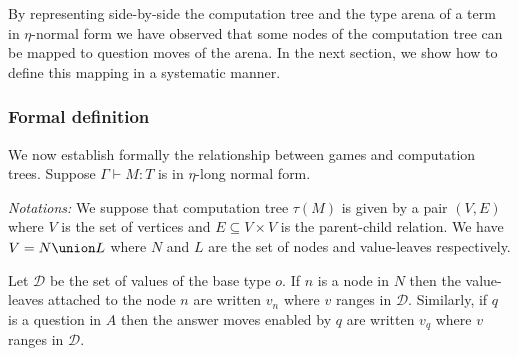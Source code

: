By representing side-by-side the computation tree and the type arena of a term in $\eta$-normal form we have observed
that some nodes of the computation tree can be mapped to question moves of the arena.
In the next section, we show how to define this mapping in a systematic manner.

\subsubsection{Formal definition}

We now establish formally the relationship between games and
computation trees. Suppose $\Gamma \vdash M : T$ is in $\eta$-long
normal form.

\emph{Notations:} We suppose that computation tree $\tau(M)$ is given by
a pair $(V,E)$ where $V$ is the set of vertices and $E \subseteq
V \times V$ is the parent-child relation. We have $V = N \union L$
where $N$ and $L$ are the set of nodes and value-leaves respectively.

Let $\mathcal{D}$ be the set of values of the base type $o$. If $n$
is a node in $N$ then the value-leaves attached to the node $n$ are
written $v_n$ where $v$ ranges in $\mathcal{D}$. Similarly, if $q$
is a question in $A$ then the answer moves enabled by $q$ are
written $v_q$ where $v$ ranges in $\mathcal{D}$.

